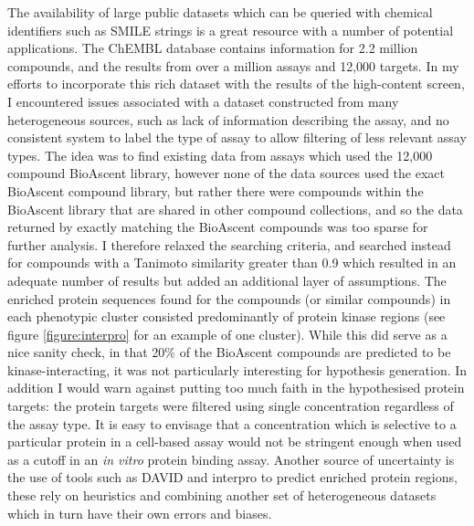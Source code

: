 \documentclass[a4paper,11pt,twoside,openright]{scrbook}
\begin{document}
The availability of large public datasets which can be queried with chemical identifiers such as SMILE strings is a 
great resource with a number of potential applications.
The ChEMBL database contains information for 2.2 million compounds, and the results from over a million assays and 
12,000 targets.
In my efforts to incorporate this rich dataset with the results of the high-content screen, I encountered issues 
associated with a dataset constructed from many heterogeneous sources, such as lack of information describing the 
assay, and no consistent system to label the type of assay to allow filtering of less relevant assay types.
The idea was to find existing data from assays which used the 12,000 compound BioAscent library, however none of the 
data sources used the exact BioAscent compound library, but rather there were compounds within the BioAscent library 
that are shared in other compound collections, and so the data returned by exactly matching the BioAscent compounds was 
too sparse for further analysis.
I therefore relaxed the searching criteria, and searched instead for compounds with a Tanimoto similarity greater than 
0.9 which resulted in an adequate number of results but added an additional layer of assumptions.
The enriched protein sequences found for the compounds (or similar compounds) in each phenotypic cluster consisted 
predominantly of protein kinase regions (see figure \ref{figure:interpro} for an example of one cluster).
While this did serve as a nice sanity check, in that 20\% of the BioAscent compounds are predicted to be 
kinase-interacting, it was not particularly interesting for hypothesis generation.
In addition I would warn against putting too much faith in the hypothesised protein targets: the protein targets were 
filtered using single concentration regardless of the assay type.
It is easy to envisage that a concentration which is selective to a particular protein in a cell-based assay would not 
be stringent enough when used as a cutoff in an \textit{in vitro} protein binding assay.
Another source of uncertainty is the use of tools such as DAVID and interpro to predict enriched protein regions, these 
rely on heuristics and combining another set of heterogeneous datasets which in turn have their own errors and biases.
\end{document}
